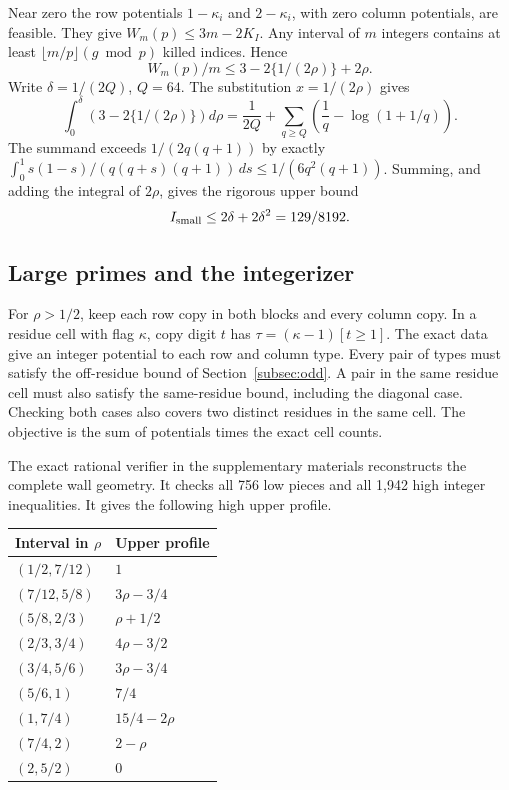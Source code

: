 Near zero the row potentials \(1-\kappa_i\) and \(2-\kappa_i\), with zero
column potentials, are feasible. They give \(W_m(p)\le3m-2K_I\). Any
interval of \(m\) integers contains at least
\(\lfloor m/p\rfloor(g\bmod p)\) killed indices. Hence
\begin{equation}\label{eq:int-near-zero}
 W_m(p)/m\le3-2\{1/(2\rho)\}+2\rho.
\end{equation}
Write \(\delta=1/(2Q)\), \(Q=64\). The substitution \(x=1/(2\rho)\) gives
\[
 \int_0^\delta(3-2\{1/(2\rho)\})d\rho
 =\frac1{2Q}+\sum_{q\ge Q}\left(\frac1q-\log(1+1/q)\right).
\]
The summand exceeds \(1/(2q(q+1))\) by exactly
\(\int_0^1s(1-s)/(q(q+s)(q+1))\,ds\le1/(6q^2(q+1))\). Summing, and adding
the integral of \(2\rho\), gives the rigorous upper bound
\begin{equation}\label{eq:int-small}
 I_{\rm small}\le2\delta+2\delta^2=129/8192.
\end{equation}

\subsection{Large primes and the integerizer}

For \(\rho>1/2\), keep each row copy in both blocks and every column copy.
In a residue cell with flag \(\kappa\), copy digit \(t\) has
\(\tau=(\kappa-1)[t\ge1]\). The exact data give an integer potential to
each row and column type. Every pair of types must satisfy the off-residue
bound of Section~\ref{subsec:odd}. A pair in the same residue cell must also
satisfy the same-residue bound, including the diagonal case. Checking both
cases also covers two distinct residues in the same cell. The objective is
the sum of potentials times the exact cell counts.

The exact rational verifier in the supplementary materials reconstructs
the complete wall geometry. It checks all 756 low pieces and all 1,942 high
integer inequalities. It gives the following high upper profile.

\begin{center}
\begin{tabular}{p{}p{}}
\hline
Interval in \(\rho\) & Upper profile \\
\hline
\((1/2,7/12)\) & \(1\) \\
\((7/12,5/8)\) & \(3\rho -3/4\) \\
\((5/8,2/3)\) & \(\rho +1/2\) \\
\((2/3,3/4)\) & \(4\rho -3/2\) \\
\((3/4,5/6)\) & \(3\rho -3/4\) \\
\((5/6,1)\) & \(7/4\) \\
\((1,7/4)\) & \(15/4-2\rho\) \\
\((7/4,2)\) & \(2-\rho\) \\
\((2,5/2)\) & \(0\) \\
\hline
\end{tabular}
\end{center}

